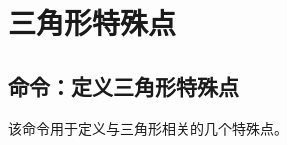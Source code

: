 \documentclass[../main.tex]{subfiles}
\begin{document}
\section{三角形特殊点}

\subsection{命令：定义三角形特殊点}

该命令用于定义与三角形相关的几个特殊点。
\end{document}
